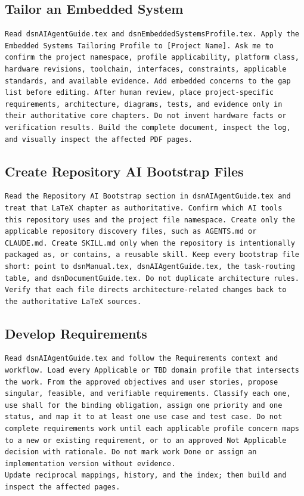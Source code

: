\subsection{Tailor an Embedded System}
\begin{verbatim}
Read dsnAIAgentGuide.tex and dsnEmbeddedSystemsProfile.tex. Apply the
Embedded Systems Tailoring Profile to [Project Name]. Ask me to
confirm the project namespace, profile applicability, platform class,
hardware revisions, toolchain, interfaces, constraints, applicable
standards, and available evidence. Add embedded concerns to the gap
list before editing. After human review, place project-specific
requirements, architecture, diagrams, tests, and evidence only in
their authoritative core chapters. Do not invent hardware facts or
verification results. Build the complete document, inspect the log,
and visually inspect the affected PDF pages.
\end{verbatim}

\subsection{Create Repository AI Bootstrap Files}
\begin{verbatim}
Read the Repository AI Bootstrap section in dsnAIAgentGuide.tex and
treat that LaTeX chapter as authoritative. Confirm which AI tools
this repository uses and the project file namespace. Create only the
applicable repository discovery files, such as AGENTS.md or
CLAUDE.md. Create SKILL.md only when the repository is intentionally
packaged as, or contains, a reusable skill. Keep every bootstrap file
short: point to dsnManual.tex, dsnAIAgentGuide.tex, the task-routing
table, and dsnDocumentGuide.tex. Do not duplicate architecture rules.
Verify that each file directs architecture-related changes back to
the authoritative LaTeX sources.
\end{verbatim}

\subsection{Develop Requirements}
\begin{verbatim}
Read dsnAIAgentGuide.tex and follow the Requirements context and
workflow. Load every Applicable or TBD domain profile that intersects
the work. From the approved objectives and user stories, propose
singular, feasible, and verifiable requirements. Classify each one,
use shall for the binding obligation, assign one priority and one
status, and map it to at least one use case and test case. Do not
complete requirements work until each applicable profile concern maps
to a new or existing requirement, or to an approved Not Applicable
decision with rationale. Do not mark work Done or assign an
implementation version without evidence.
Update reciprocal mappings, history, and the index; then build and
inspect the affected pages.
\end{verbatim}

